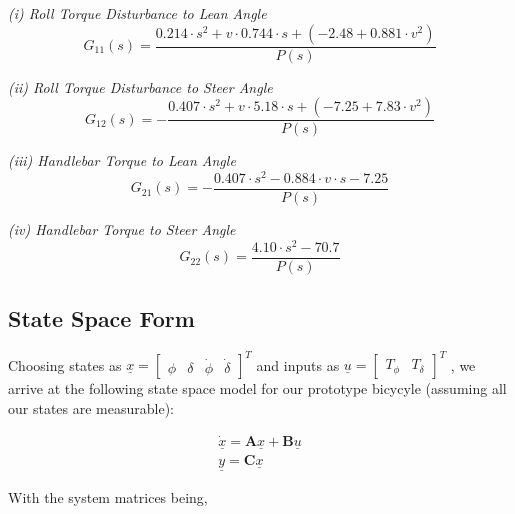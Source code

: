 \documentclass[a4paper]{article}
\begin{document}
\noindent \textit{(i) Roll Torque Disturbance to Lean Angle}
\begin{equation}
G_{11}(s) = \frac{0.214 \cdot s^2 + v \cdot 0.744 \cdot s + (-2.48 + 0.881 \cdot v^2)}{P(s)}
\end{equation}

\noindent \textit{(ii) Roll Torque Disturbance to Steer Angle}
\begin{equation}
G_{12}(s) = - \frac{0.407 \cdot s^2 + v \cdot 5.18 \cdot s + (-7.25 + 7.83 \cdot v^2)}{P(s)}
\end{equation}

\noindent \textit{(iii) Handlebar Torque to Lean Angle}
\begin{equation}
G_{21}(s) = - \frac{0.407 \cdot s^2 - 0.884 \cdot v \cdot s - 7.25}{P(s)}
\end{equation}

\noindent \textit{(iv) Handlebar Torque to Steer Angle}
\begin{equation}
G_{22}(s) = \frac{4.10 \cdot s^2 - 70.7}{P(s)}
\end{equation}

\subsection{State Space Form}

Choosing states as $\underline{x} = \begin{bmatrix}
\phi & \delta & \dot{\phi} & \dot{\delta}
\end{bmatrix}^T$ and inputs as $\underline{u} = \begin{bmatrix}
T_{\phi} & T_{\delta}
\end{bmatrix}^T$ , we arrive at the following state space model for our prototype bicycyle (assuming all our states are measurable):

\begin{equation*}
\begin{gathered}
\underline{\dot{x}} = \mathbf{A} \underline{x} + \mathbf{B} \underline{u} \\
\underline{y} = \mathbf{C} \underline{x}
\end{gathered}
\end{equation*}

\noindent With the system matrices being,
\end{document}
